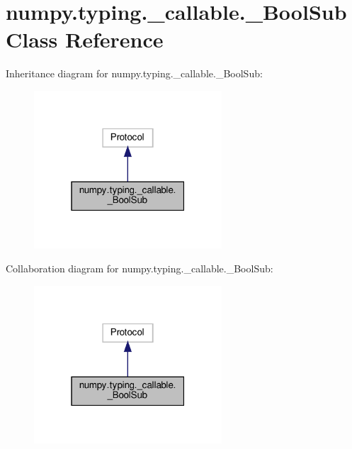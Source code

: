 \hypertarget{classnumpy_1_1typing_1_1__callable_1_1__BoolSub}{}\section{numpy.\+typing.\+\_\+callable.\+\_\+\+Bool\+Sub Class Reference}
\label{classnumpy_1_1typing_1_1__callable_1_1__BoolSub}


Inheritance diagram for numpy.\+typing.\+\_\+callable.\+\_\+\+Bool\+Sub\+:
\nopagebreak
\begin{figure}[H]
\begin{center}
\leavevmode
\includegraphics[width=199pt]{classnumpy_1_1typing_1_1__callable_1_1__BoolSub__inherit__graph}
\end{center}
\end{figure}


Collaboration diagram for numpy.\+typing.\+\_\+callable.\+\_\+\+Bool\+Sub\+:
\nopagebreak
\begin{figure}[H]
\begin{center}
\leavevmode
\includegraphics[width=199pt]{classnumpy_1_1typing_1_1__callable_1_1__BoolSub__coll__graph}
\end{center}
\end{figure}
